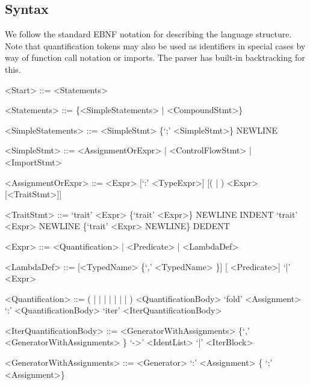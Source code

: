
\subsection{Syntax}
We follow the standard EBNF notation for describing the language structure. Note that quantification tokens may also be used as identifiers in special cases by way of function call notation or imports. The parser has built-in backtracking for this.

\begin{grammar}
<Start> ::= <Statements>

<Statements> ::= \{<SimpleStatements> | <CompoundStmt>\}


<SimpleStatements> ::= <SimpleStmt> \{`;' <SimpleStmt>\} NEWLINE

<SimpleStmt> ::= <AssignmentOrExpr> | <ControlFlowStmt> | <ImportStmt>

<AssignmentOrExpr> ::= <Expr> [`:' <TypeExpr>] [(\lit{$\coloneqq$} | \lit{$:\in$}) <Expr> [<TraitStmt>]]

<TraitStmt> ::= `trait' <Expr> \{`trait' <Expr>\}
    \alt NEWLINE INDENT `trait' <Expr> NEWLINE \{`trait' <Expr> NEWLINE\} DEDENT

<Expr> ::= <Quantification> | <Predicate> | <LambdaDef>

<LambdaDef> ::= \lit{$\lambda$} [<TypedName> \{`,' <TypedName> \}] [\lit{$\cdot$} <Predicate>] `|' <Expr>

<Quantification> ::= (\lit{$\sum$} | \lit{$\prod$} | \lit{$\bigcup$} | \lit{$\bigcap$} | \lit{$\exists$} | \lit{$\forall$} | \lit{$\uparrow$} | \lit{$\downarrow$}) <QuantificationBody>
    \alt `fold' <Assignment> `:' <QuantificationBody>
    \alt `iter' <IterQuantificationBody>

<IterQuantificationBody> ::= <GeneratorWithAssignments> \{`,' <GeneratorWithAssignments> \} `->' <IdentList> `|' <IterBlock>

<GeneratorWithAssignments> ::= <Generator> `:' <Assignment> \{ `;' <Assignment>\}


\end{grammar}
